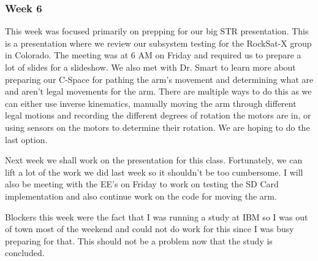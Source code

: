 \subsubsection{Week 6}
This week was focused primarily on prepping for our big STR presentation. This is a presentation where we review our 
subsystem testing for the RockSat-X group in Colorado. The meeting was at 6 AM on Friday and required us to prepare a 
lot of slides for a slideshow. We also met with Dr. Smart to learn more about preparing our C-Space for 
pathing the arm's movement and determining what are and aren't legal movements for the arm. There are multiple ways
to do this as we can either use inverse kinematics, manually moving the arm through different legal motions and 
recording the different degrees of rotation the motors are in, or using sensors on the motors to determine their 
rotation. We are hoping to do the last option.

Next week we shall work on the presentation for this class. Fortunately, we can lift a lot of the work we did last 
week so it shouldn't be too cumbersome. I will also be meeting with the EE's on Friday to work on testing the SD Card 
implementation and also continue work on the code for moving the arm.

Blockers this week were the fact that I was running a study at IBM so I was out of town most of the weekend and could 
not do work for this since I was busy preparing for that. This should not be a problem now that the study is 
concluded.